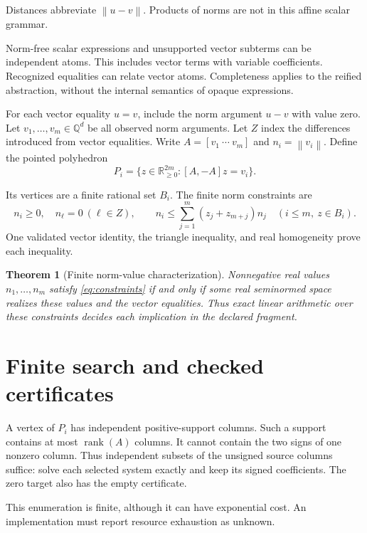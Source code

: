 \documentclass{article}
\newtheorem{theorem}{Theorem}
\newcommand{\R}{\mathbb{R}}
\newcommand{\Q}{\mathbb{Q}}
\newcommand{\norm}[1]{\left\lVert#1\right\rVert}
\begin{document}
Distances abbreviate $\norm{u-v}$.
Products of norms are not in this affine scalar grammar.

Norm-free scalar expressions and unsupported vector subterms can be independent atoms.
This includes vector terms with variable coefficients.
Recognized equalities can relate vector atoms.
Completeness applies to the reified abstraction, without the internal semantics of opaque expressions.

For each vector equality $u=v$, include the norm argument $u-v$ with value zero.
Let $v_1,\ldots,v_m\in\Q^d$ be all observed norm arguments.
Let $Z$ index the differences introduced from vector equalities.
Write $A=[v_1\ \cdots\ v_m]$ and $n_i=\norm{v_i}$.
Define the pointed polyhedron
\begin{equation}\label{eq:polyhedron}
 P_i=\{z\in\R_{\ge0}^{2m}:[A,-A]z=v_i\}.
\end{equation}

Its vertices are a finite rational set $B_i$.
The finite norm constraints are
\begin{equation}\label{eq:constraints}
 n_i\ge0,\quad n_\ell=0\ (\ell\in Z),\qquad
 n_i\le\sum_{j=1}^m(z_j+z_{m+j})n_j
 \quad(i\le m,\ z\in B_i).
\end{equation}
One validated vector identity, the triangle inequality, and real homogeneity prove each inequality.

\begin{theorem}[Finite norm-value characterization]\label{thm:complete}
Nonnegative real values $n_1,\ldots,n_m$ satisfy \eqref{eq:constraints} if and only if some real seminormed space realizes these values and the vector equalities.
Thus exact linear arithmetic over these constraints decides each implication in the declared fragment.
\end{theorem}

\section{Finite search and checked certificates}
\label{sec:procedure}
A vertex of $P_i$ has independent positive-support columns.
Such a support contains at most $\operatorname{rank}(A)$ columns.
It cannot contain the two signs of one nonzero column.
Thus independent subsets of the unsigned source columns suffice: solve each selected system exactly and keep its signed coefficients.
The zero target also has the empty certificate.

This enumeration is finite, although it can have exponential cost.
An implementation must report resource exhaustion as unknown.
\end{document}
